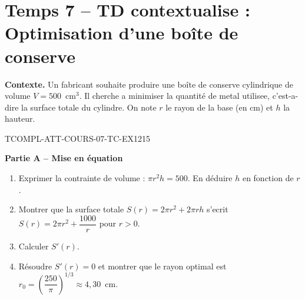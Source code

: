 

\section*{Temps 7 -- TD contextualise : Optimisation d'une boîte de conserve}

\textbf{Contexte.} Un fabricant souhaite produire une boîte de conserve cylindrique de volume $V = 500$~cm$^3$. Il cherche a minimiser la quantité de metal utilisee, c'est-a-dire la surface totale du cylindre. On note $r$ le rayon de la base (en cm) et $h$ la hauteur.

\bigskip


\begin{exercice}{TCOMPL-ATT-COURS-07-TC-EX1}{2}{15}

\textbf{Partie A -- Mise en équation}

\begin{enumerate}
  \item Exprimer la contrainte de volume : $\pi r^2 h = 500$. En déduire $h$ en fonction de $r$.
  \item Montrer que la surface totale $S(r) = 2\pi r^2 + 2\pi r h$ s'ecrit $S(r) = 2\pi r^2 + \dfrac{1000}{r}$ pour $r > 0$.
  \item Calculer $S'(r)$.
  \item Résoudre $S'(r) = 0$ et montrer que le rayon optimal est $r_0 = \left(\dfrac{250}{\pi}\right)^{1/3} \approx 4{,}30$~cm.
\end{enumerate}

\end{exercice}


